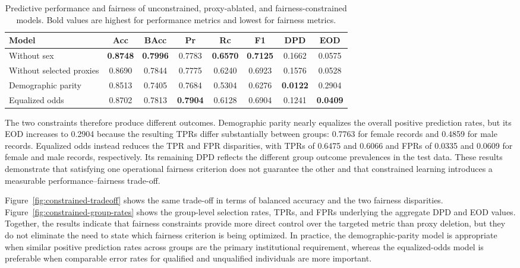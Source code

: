\documentclass{article}
\begin{document}
\begin{table}[t]
  \centering
  \footnotesize
  \caption{Predictive performance and fairness of unconstrained,
  proxy-ablated, and fairness-constrained models. Bold values are highest for
  performance metrics and lowest for fairness metrics.}
  \label{tab:constrained-learning}
  \setlength{\tabcolsep}{4pt}
  \begin{tabular}{lccccccc}
    \toprule
    Model & Acc & BAcc & Pr & Rc & F1 & DPD & EOD \\
    \midrule
    Without sex & \textbf{0.8748} & \textbf{0.7996} & 0.7783 & \textbf{0.6570} & \textbf{0.7125} & 0.1662 & 0.0575 \\
    Without selected proxies & 0.8690 & 0.7844 & 0.7775 & 0.6240 & 0.6923 & 0.1576 & 0.0528 \\
    Demographic parity & 0.8513 & 0.7405 & 0.7684 & 0.5304 & 0.6276 & \textbf{0.0122} & 0.2904 \\
    Equalized odds & 0.8702 & 0.7813 & \textbf{0.7904} & 0.6128 & 0.6904 & 0.1241 & \textbf{0.0409} \\
    \bottomrule
  \end{tabular}
\end{table}

The two constraints therefore produce different outcomes. Demographic parity
nearly equalizes the overall positive prediction rates, but its EOD increases
to 0.2904 because the resulting TPRs differ substantially between groups:
0.7763 for female records and 0.4859 for male records. Equalized odds instead
reduces the TPR and FPR disparities, with TPRs of 0.6475 and 0.6066 and FPRs
of 0.0335 and 0.0609 for female and male records, respectively. Its remaining
DPD reflects the different group outcome prevalences in the test data. These
results demonstrate that satisfying one operational fairness criterion does
not guarantee the other and that constrained learning introduces a measurable
performance--fairness trade-off.

Figure~\ref{fig:constrained-tradeoff} shows the same trade-off in terms of
balanced accuracy and the two fairness disparities. Figure~\ref{fig:constrained-group-rates}
shows the group-level selection rates, TPRs, and FPRs underlying the aggregate
DPD and EOD values. Together, the results indicate that fairness constraints
provide more direct control over the targeted metric than proxy deletion, but
they do not eliminate the need to state which fairness criterion is being
optimized. In practice, the demographic-parity model is appropriate when
similar positive prediction rates across groups are the primary institutional
requirement, whereas the equalized-odds model is preferable when comparable
error rates for qualified and unqualified individuals are more important.
\end{document}
